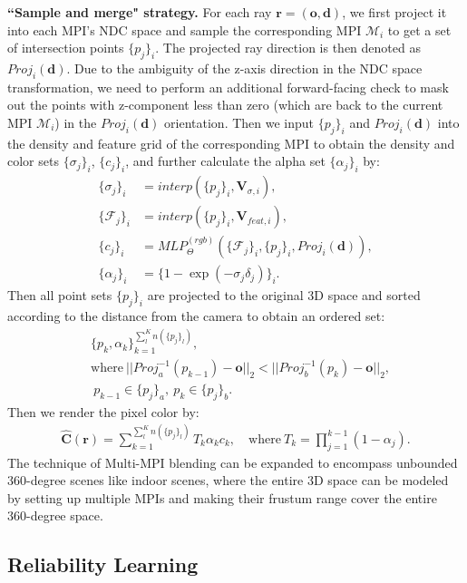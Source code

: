 \documentclass[letterpaper, 10 pt, conference]{ieeeconf}  %
\begin{document}
{\bf ``Sample and merge" strategy.} 
For each ray $ \mathbf{r}=(\mathbf{o},\mathbf{d}) $, we first project it into each MPI's NDC space %
and sample the corresponding MPI $\mathcal{M}_i$ to get a set of intersection points $\{ p_j \}_i$. The projected ray direction is then denoted as $Proj_i(\mathbf{d})$. Due to the ambiguity of the z-axis direction in the NDC space transformation, we need to perform an additional forward-facing check to mask out the points with z-component less than zero (which are back to the current MPI $\mathcal{M}_i$) in the $Proj_i(\mathbf{d})$ orientation. Then we input $\{p_j\}_i$ and $Proj_i(\mathbf{d})$ into the density and feature grid of the corresponding MPI to obtain the density and color sets $\{\sigma_j\}_i$, $\{c_j\}_i$, and further calculate the alpha set $\{\alpha _j\}_i$ by:
\begin{align}
    \{\sigma_j\}_i & =interp(\{p_j\}_i, \mathbf{V}_{\sigma,i}), \\
    \{\mathcal{F}_j\}_i & =interp(\{p_j\}_i, \mathbf{V}_{feat,i}), \\
    \{c_j\}_i & = MLP^{(rgb)}_\Theta(\{\mathcal{F}_j\}_i, \{p_j\}_i, Proj_i(\mathbf{d})), \\
    \{\alpha_j\}_i & =\{ 1-\exp(-\sigma_j\delta_j) \}_i.
\end{align}
Then all point sets $\{p_j\}_i$ are projected to the original 3D space and sorted according to the distance from the camera to obtain an ordered set:
\begin{align}
    & \{p_k, \alpha_k\}_{k=1}^{\sum_l^K n(\{p_j\}_l)}, \\
    & \text{where}\ \vert\vert Proj^{-1}_a(p_{k-1})-\mathbf{o}\vert\vert_2 < \vert\vert Proj^{-1}_b(p_{k})-\mathbf{o}\vert\vert_2, \nonumber\\
    & \ p_{k-1}\in\{p_j\}_a,\ p_{k}\in\{p_j\}_b.
\end{align}
Then we render the pixel color by:
\begin{align}
    \mathbf{\hat C}(\mathbf{r})=\sum_{k=1}^{\sum_l^K n(\{p_j\}_l)} T_k\alpha_kc_k,\quad  \text{where}\ T_k=\prod_{j=1}^{k-1}(1-\alpha_j).
\label{eq:rendering}
\end{align}
The technique of Multi-MPI blending can be expanded to encompass unbounded 360-degree scenes like indoor scenes, where the entire 3D space can be modeled by setting up multiple MPIs and making their frustum range cover the entire 360-degree space.


\subsection{Reliability Learning} \label{sec:reliab}
\end{document}

